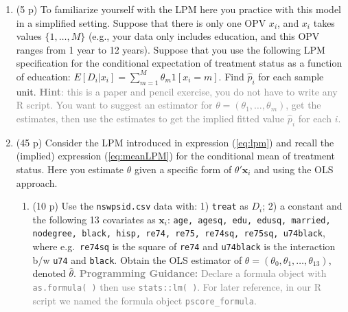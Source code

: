 \documentclass[
]{article}
\begin{document}
\begin{enumerate}
\def\labelenumi{\arabic{enumi}.}
\item
  (5 p) To familiarize yourself with the LPM here you practice with this
  model in a simplified setting. Suppose that there is only one OPV
  \(x_i\), and \(x_i\) takes values \(\{1,\ldots,M\}\) (e.g., your data
  only includes education, and this OPV ranges from 1 year to 12 years).
  Suppose that you use the following LPM specification for the
  conditional expectation of treatment status as a function of
  education: \(E[D_i|x_i]=\sum_{m=1}^{M}\theta_m1[x_i=m]\). Find
  \(\hat{p}_i\) for each sample unit.
  \textcolor{gray}{\textbf{Hint}: this is a paper and pencil exercise, you do not have to write any R script. You want to suggest an estimator for $\theta=(\theta_1,\ldots,\theta_m)$, get the estimates, then use the estimates to get the implied fitted value $\hat{p}_i$ for each $i$.}
\item
  (45 p) Consider the LPM introduced in expression (\ref{eq:lpm}) and
  recall the (implied) expression (\ref{eq:meanLPM}) for the conditional
  mean of treatment status. Here you estimate \(\theta\) given a
  specific form of \(\theta'\mathbf{x}_{i}\) and using the OLS
  approach.\label{item:lpm:ols}

  \begin{enumerate}
  \def\labelenumii{\alph{enumii}.}
  \item
    (10 p) Use the \texttt{nswpsid.csv} data with: 1) \texttt{treat} as
    \(D_i\); 2) a constant and the following 13 covariates as
    \(\mathbf{x}_{i}\):
    \texttt{age, agesq, edu, edusq, married, nodegree, black, hisp, re74, re75, re74sq, re75sq, u74black},
    where e.g.~\texttt{re74sq} is the square of \texttt{re74} and
    \texttt{u74black} is the interaction b/w \texttt{u74} and
    \texttt{black}. Obtain the OLS estimator of
    \(\theta=(\theta_0,\theta_1,\ldots,\theta_{13})\), denoted
    \(\hat{\theta}\).
    \textcolor{gray}{\textbf{Programming Guidance:} Declare a formula object with \texttt{as.formula( )} then use \texttt{stats::lm( )}. For later reference, in our R script we named the formula object \texttt{pscore\_formula}.}
    \label{item:lpm:ols:reg}


\end{enumerate}
\end{enumerate}
\end{document}

